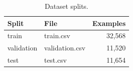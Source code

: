 \begin{table}[t]\centering\caption{Dataset splits.}
\begin{tabular}{llr}\hline
Split & File & Examples \\\hline
train & train.csv & 32,568 \\
validation & validation.csv & 11,520 \\
test & test.csv & 11,654 \\
\hline\end{tabular}\end{table}

